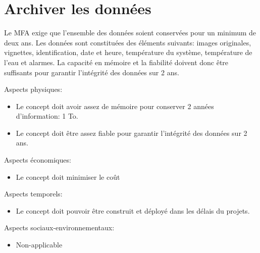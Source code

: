 

\section{Archiver les données}
\label{s:faisab_archiver}
Le MFA exige que l’ensemble des données soient conservées pour un minimum de deux ans. Les données sont constituées des éléments suivants: images originales, vignettes, identification, date et heure, température du système, température de l’eau et alarmes. La capacité en mémoire et la fiabilité doivent donc être suffisants pour garantir l’intégrité des données sur 2 ans.

Aspects physiques:
\begin{itemize}
	\item Le concept doit avoir assez de mémoire pour conserver 2 années d'information: 1 To.
	\item Le concept doit être assez fiable pour garantir l’intégrité des données sur 2 ans.
\end{itemize}

Aspects économiques:
\begin{itemize}
	\item Le concept doit minimiser le coût 
\end{itemize}

Aspects temporels:
\begin{itemize}
	\item Le concept doit pouvoir être construit et déployé dans les délais du projets.
\end{itemize}

Aspects sociaux-environnementaux:
\begin{itemize}
	\item Non-applicable
\end{itemize}








